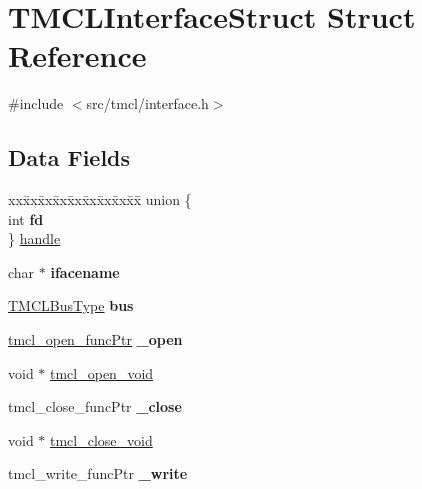 \hypertarget{structTMCLInterfaceStruct}{
\section{TMCLInterfaceStruct Struct Reference}
\label{structTMCLInterfaceStruct}
}


{\ttfamily \#include $<$src/tmcl/interface.h$>$}\subsection*{Data Fields}
\begin{DoxyCompactItemize}
\item 
\begin{tabbing}
xx\=xx\=xx\=xx\=xx\=xx\=xx\=xx\=xx\=\kill
union \{\\
\>int {\bfseries fd}\\
\} \hyperlink{structTMCLInterfaceStruct_a32dd1aec6b11ffd4af19f56917a5809a}{handle}\\

\end{tabbing}\item 
\hypertarget{structTMCLInterfaceStruct_a4f925de555bdc1c95a05345d767fa104}{
char $\ast$ {\bfseries ifacename}}
\label{structTMCLInterfaceStruct_a4f925de555bdc1c95a05345d767fa104}

\item 
\hypertarget{structTMCLInterfaceStruct_ae34c6fdc322e95d6eac964203b6b2ab5}{
\hyperlink{tmcldefs_8h_ad26e4e286a55d7c739fd473d8cdd882e}{TMCLBusType} {\bfseries bus}}
\label{structTMCLInterfaceStruct_ae34c6fdc322e95d6eac964203b6b2ab5}

\item 
\hypertarget{structTMCLInterfaceStruct_a45748d0c9af5e9452a964bffd971d644}{
\hyperlink{interface_8h_a1f8f6db177582534470f015805447f32}{tmcl\_\-open\_\-funcPtr} {\bfseries \_\-open}}
\label{structTMCLInterfaceStruct_a45748d0c9af5e9452a964bffd971d644}

\item 
void $\ast$ \hyperlink{structTMCLInterfaceStruct_af15b6916e8874e2276df5953e3c39781}{tmcl\_\-open\_\-void}
\item 
\hypertarget{structTMCLInterfaceStruct_a3b2fe6c508be6bce1b67837641a88555}{
tmcl\_\-close\_\-funcPtr {\bfseries \_\-close}}
\label{structTMCLInterfaceStruct_a3b2fe6c508be6bce1b67837641a88555}

\item 
void $\ast$ \hyperlink{structTMCLInterfaceStruct_a0bb104a6c9e2e8adb097ed7261b008ad}{tmcl\_\-close\_\-void}
\item 
\hypertarget{structTMCLInterfaceStruct_a9eea8dbe2219cbc0a35d2ac19684990a}{
tmcl\_\-write\_\-funcPtr {\bfseries \_\-write}}
\label{structTMCLInterfaceStruct_a9eea8dbe2219cbc0a35d2ac19684990a}


\end{DoxyCompactItemize}
